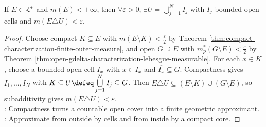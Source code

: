 \begin{theorem} \label{thm:finite-cell-symmetric-difference-approximation} \\
If $E\in\mathcal{L}^p$ and $m(E)<+\infty$, then $\forall\varepsilon>0$, $\exists U=\bigcup\limits_{j=1}^{N}I_j$ with $I_j$ bounded open cells and $m(E\triangle U)<\varepsilon$.
\begin{proof}
Choose compact $K\subseteq E$ with $m(E\setminus K)<\frac{\varepsilon}{2}$ by Theorem \ref{thm:compact-characterization-finite-outer-measure}, and open $G\supseteq E$ with $m_p^\ast(G\setminus E)<\frac{\varepsilon}{2}$ by Theorem \ref{thm:open-gdelta-characterization-lebesgue-measurable}. For each $x\in K$, choose a bounded open cell $I_x$ with $x\in I_x$ and $\overline{I_x}\subseteq G$. Compactness gives $I_1,\ldots,I_N$ with $K\subseteq U\defeq\bigcup\limits_{j=1}^{N}I_j\subseteq G$. Then $E\triangle U\subseteq(E\setminus K)\cup(G\setminus E)$, so subadditivity gives $m(E\triangle U)<\varepsilon$.\\
: Compactness turns a countable open cover into a finite geometric approximant.\\
: Approximate from outside by cells and from inside by a compact core.
\end{proof}
\end{theorem}

